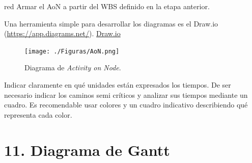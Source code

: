 \documentclass[
11pt, %
codirector, %
]{charter}
\begin{document}
\begin{consigna}{red}
Armar el AoN a partir del WBS definido en la etapa anterior.

Una herramienta simple para desarrollar los diagramas es el Draw.io (\url{https://app.diagrams.net/}).
\href{https://app.diagrams.net}{Draw.io}


\begin{figure}[htpb]
\centering 
\texttt{[image: ./Figuras/AoN.png]}
\caption{Diagrama de \textit{Activity on Node}.}
\label{fig:AoN}
\end{figure}

Indicar claramente en qué unidades están expresados los tiempos.
De ser necesario indicar los caminos semi críticos y analizar sus tiempos mediante un cuadro.
Es recomendable usar colores y un cuadro indicativo describiendo qué representa cada color.

\end{consigna}

\section{11. Diagrama de Gantt}
\label{sec:gantt}
\end{document}
